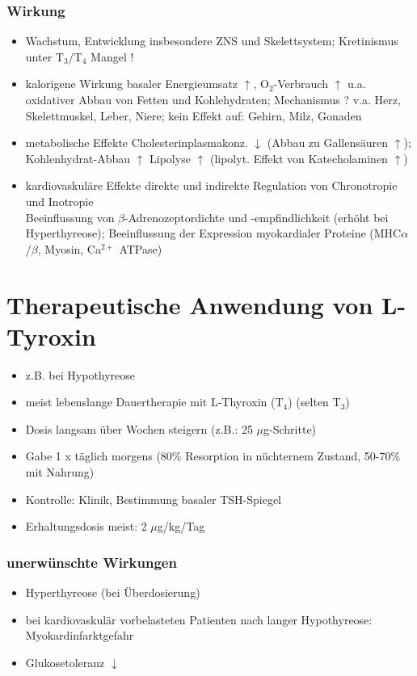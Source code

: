 \documentclass[10pt,a4paper]{report}
\begin{document}
\subsubsection{Wirkung} %
\label{par:wirkung}
\begin{itemize}
	\item Wachstum, Entwicklung
	insbesondere ZNS und Skelettsystem; Kretinismus unter T$_3$/T$_4$ Mangel !
	\item kalorigene Wirkung
	basaler Energieumsatz $\uparrow$, O$_2$-Verbrauch $\uparrow$ 
	u.a. oxidativer Abbau von Fetten und Kohlehydraten; Mechanismus ?
	v.a. Herz, Skelettmuskel, Leber, Niere; kein Effekt auf: Gehirn, Milz, Gonaden
	\item metabolische Effekte
	Cholesterinplasmakonz. $\downarrow$ (Abbau zu Gallensäuren $\uparrow$); Kohlenhydrat-Abbau $\uparrow$
	Lipolyse $\uparrow$ (lipolyt. Effekt von Katecholaminen $\uparrow$)
	\item kardiovaskuläre Effekte
	direkte und indirekte Regulation von Chronotropie und Inotropie\\
	Beeinflussung von $\beta$-Adrenozeptordichte und -empfindlichkeit
	(erhöht bei Hyperthyreose); Beeinflussung der Expression myokardialer 
	Proteine (MHC$\alpha$/$\beta$, Myosin, Ca$^{2+}$ ATPase)
\end{itemize}
\section{Therapeutische Anwendung von L-Tyroxin} %
\label{sec:therapeutische_anwendung_von_l_tyroxin}
\begin{itemize}
	\item z.B. bei Hypothyreose
	\item meist lebenslange Dauertherapie mit L-Thyroxin (T$_4$) (selten T$_3$)
	\item Dosis langsam über Wochen steigern (z.B.: 25 $\mu$g-Schritte)
	\item Gabe 1 x täglich morgens  (80\% Resorption in nüchternem Zustand, 50-70\% mit Nahrung)
	\item Kontrolle: Klinik, Bestimmung basaler TSH-Spiegel
	\item Erhaltungsdosis meist: 2 $\mu$g/kg/Tag
\end{itemize}
\subsubsection{unerwünschte Wirkungen} %
\label{par:unerw_nschte_wirkungen}
\begin{itemize}
	\item Hyperthyreose (bei Überdosierung)
	\item bei kardiovaskulär vorbelasteten Patienten nach langer Hypothyreose: Myokardinfarktgefahr
	\item Glukosetoleranz $\downarrow$
\end{itemize}
\end{document}
